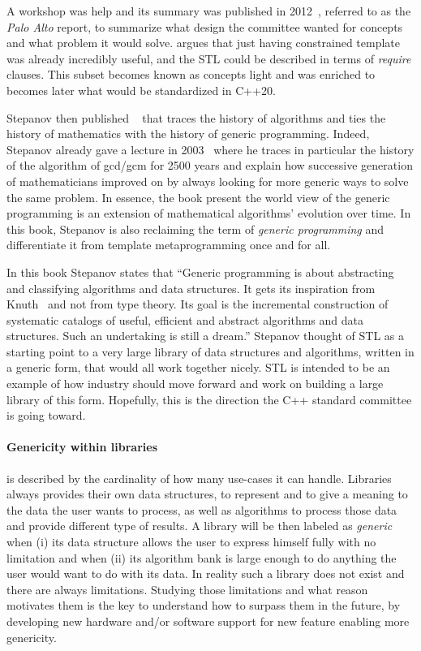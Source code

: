 A workshop was help and its summary was published in 2012~\parencite{sutton.2012.concepts}, referred to as the \emph{Palo
  Alto} report, to summarize what design the committee wanted for concepts and what problem it would solve.
 argues that just having constrained template was already incredibly useful, and the
STL could be described in terms of \emph{require} clauses. This subset becomes known as concepts light and was enriched
to becomes later what would be standardized in C++20.

Stepanov then published ~\parencite{stepanov.2014.mathematics} that traces the
history of algorithms and ties the history of mathematics with the history of generic programming. Indeed, Stepanov
already gave a lecture in 2003~\parencite{stepanov.2003.gcm} where he traces in particular the history of the algorithm
of gcd/gcm for 2500 years and explain how successive generation of mathematicians improved on by always looking for more
generic ways to solve the same problem. In essence, the book present the world view of the generic programming is an
extension of mathematical algorithms' evolution over time. In this book, Stepanov is also reclaiming the term of
\emph{generic programming} and differentiate it from template metaprogramming once and for all.

In this book Stepanov states that ``Generic programming is about abstracting and classifying algorithms and data
structures. It gets its inspiration from Knuth~\parencite{knuth.2014.art} and not from type theory. Its goal is the
incremental construction of systematic catalogs of useful, efficient and abstract algorithms and data structures. Such
an undertaking is still a dream.'' Stepanov thought of STL as a starting point to a very large library of data
structures and algorithms, written in a generic form, that would all work together nicely. STL is intended to be an
example of how industry should move forward and work on building a large library of this form. Hopefully, this is the
direction the C++ standard committee is going toward.

\paragraph{Genericity within libraries} is described by the cardinality of how many use-cases it can handle. Libraries
always provides their own data structures, to represent and to give a meaning to the data the user wants to process, as
well as algorithms to process those data and provide different type of results. A library will be then labeled as
\emph{generic}~\parencite{musser.1994.algorithm} when (i) its data structure allows the user
to express himself fully with no limitation and when (ii) its algorithm bank is large enough to do anything the user
would want to do with its data. In reality such a library does not exist and there are always limitations. Studying
those limitations and what reason motivates them is the key to understand how to surpass them in the future, by
developing new hardware and/or software support for new feature enabling more genericity.

